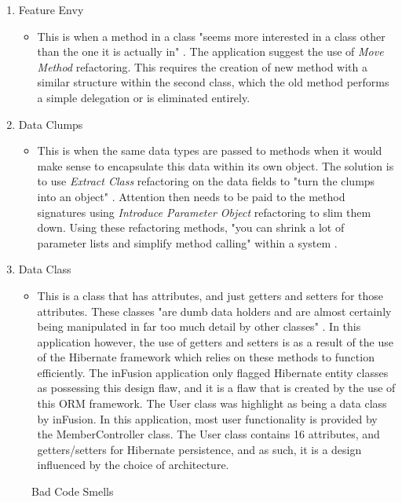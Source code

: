 \begin{enumerate}
\begin{itemize}
\end{itemize}
\item Feature Envy
\begin{itemize}
\item This is when a method in a class "seems more interested in a class other than the one it is actually in" \parencite{beck1999bad}. The application suggest the use of \textit{Move Method} refactoring. This requires the creation of new method with a similar structure within the second class, which the old method performs a simple delegation or is eliminated entirely.
\end{itemize}
\item Data Clumps
\begin{itemize}
\item This is when the same data types are passed to methods when it would make sense to encapsulate this data within its own object. The solution is to use \textit{Extract Class} refactoring on the data fields to "turn the clumps into an object" \parencite{beck1999bad}. Attention then needs to be paid to the method signatures using \textit{Introduce Parameter Object} refactoring to slim them down. Using these refactoring methods, "you can shrink a lot of parameter lists and simplify method calling" within a system \parencite{beck1999bad}.
\end{itemize}
\item Data Class
\begin{itemize}
\item This is a class that has attributes, and just getters and setters for those attributes. These classes "are dumb data holders and are almost certainly being manipulated in far too much detail by other classes" \parencite{beck1999bad}. In this application however, the use of getters and setters is as a result of the use of the Hibernate framework which relies on these methods to function efficiently. The inFusion application only flagged Hibernate entity classes as possessing this design flaw, and it is a flaw that is created by the use of this ORM framework. The User class was highlight as being a data class by inFusion. In this application, most user functionality is provided by the MemberController class. The User class contains 16 attributes, and getters/setters for Hibernate persistence, and as such, it is a design influenced by the choice of architecture.
\end{itemize}
\end{enumerate}
\begin{figure}[h]
\caption{Bad Code Smells}
\label{fig:badcodesmells}
\end{figure}


